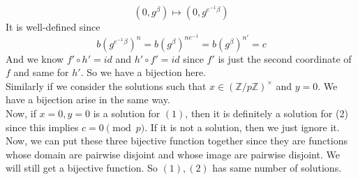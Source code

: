 \documentclass[12pt]{amsart}
\newcommand{\Z}{\mathbb{Z}}
\begin{document}
\[(0,g^\beta)\mapsto(0,g^{e^{-1}\beta})\]
It is well-defined since 
\[b(g^{e^{-1}\beta })^{n}=b(g^{\beta })^{ne^{-1}}=b(g^{\beta })^{n'}=c\]
And we know $f'\circ h'=id$ and $h'\circ f'=id$ since $f'$ is just the second coordinate of $f$ and same for $h'$.
So we have a bijection here.\\
Similarly if we consider the solutions such that $x\in(\Z/p\Z)^\times$ and $y=0$. We have a bijection arise in the same way.\\
Now, if $x=0,y=0$ is a solution for $(1)$, then it is definitely a solution for (2) since this implies $c=0\pmod p$.
If it is not a solution, then we just ignore it.\\
Now, we can put these three bijective function together since they are functions whose domain are pairwise disjoint and whose image are pairwise disjoint. We will still get a bijective function. So $(1),(2)$ has same number of solutions.
\end{document}
